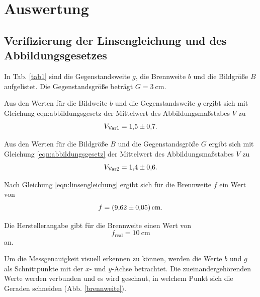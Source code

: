 \section{Auswertung}
\label{sec:Auswertung}

\subsection{Verifizierung der Linsengleichung und des Abbildungsgesetzes}
\label{sec:brennweite1}

In Tab. \ref{tab1} sind die Gegenstandsweite $g$, die Brennweite $b$ und die Bildgröße $B$ aufgelistet. Die Gegenstandsgröße beträgt $G = \SI{3}{\centi\meter}$.



\noindent Aus den Werten für die Bildweite $b$ und die Gegenstandsweite $g$ ergibt sich mit Gleichung {eqn:abbildungsgesetz} der Mittelwert des Abbildungsmaßstabes $V$ zu 
\begin{equation*}
    V_\text{Var1} = \num{1.5 \pm 0.7}.
\end{equation*}

\noindent Aus den Werten für die Bildgröße $B$ und die Gegenstandsgröße $G$ ergibt sich mit Gleichung \eqref{eqn:abbildungsgesetz} der Mittelwert des Abbildungsmaßstabes $V$ zu
\begin{equation*}
    V_\text{Var2} = \num{1.4 \pm 0.6}.
\end{equation*}

\noindent Nach Gleichung \eqref{eqn:linsengleichung} ergibt sich für die Brennweite $f$ ein Wert von 
\begin{equation*}
    f = \SI{9.62 \pm 0.05}{\centi\meter}.
\end{equation*}

\noindent Die Herstellerangabe gibt für die Brennweite einen Wert von 
\begin{equation*}
    f_\text{real} = \SI{10}{\centi\meter}
\end{equation*}
an.

\noindent Um die Messgenauigkeit visuell erkennen zu können, werden die Werte $b$ und $g$ als Schnittpunkte mit der $x$- und $y$-Achse betrachtet. Die zueinandergehörenden Werte werden verbunden und es wird geschaut, in welchem Punkt sich die Geraden schneiden (Abb. \ref{brennweite}).

